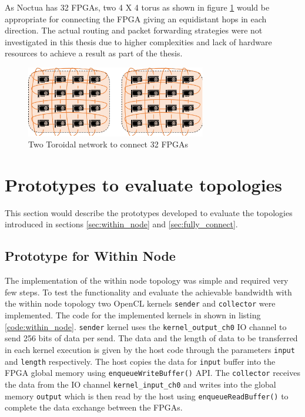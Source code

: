 As Noctua has 32 FPGAs, two 4 X 4 torus as shown in figure \ref{fig:toroidal}
would be appropriate for connecting the FPGA giving an equidistant
hops in each direction. The actual routing and packet forwarding strategies
were not investigated in this thesis due to higher complexities
and lack of hardware resources to achieve a result as part of the thesis.

\begin{figure}[h]%
    \centering
    \includegraphics[width=0.7\textwidth]{images/torus}
    \caption{Two Toroidal network to connect 32 FPGAs}
    \label{fig:toroidal}
\end{figure}

\section{Prototypes to evaluate topologies}
\label{sec:proto_topo}

This section would describe the prototypes developed to evaluate the topologies
introduced in sections \ref{sec:within_node} and \ref{sec:fully_connect}.

\subsection{Prototype for Within Node}

The implementation of the within node topology was simple and required very few
steps. To test the functionality and evaluate the achievable bandwidth with the
within node topology two OpenCL kernels \texttt{sender} and \texttt{collector}
were implemented. The code for the implemented kernels in shown in listing
\ref{code:within_node}. \texttt{sender} kernel uses the
\texttt{kernel\_output\_ch0} IO channel to send 256 bits of data per send.
The data and the length of data to be transferred in each kernel execution
is given by the host code through the parameters \texttt{input} and
\texttt{length} respectively. The host copies the data for \texttt{input}
buffer into the FPGA global memory using \texttt{enqueueWriteBuffer()} API.
The \texttt{collector} receives the data from the IO channel \texttt{kernel\_input\_ch0}
and writes into the global memory \texttt{output} which
is then read by the host using \texttt{enqueueReadBuffer()} to complete
the data exchange between the FPGAs.

